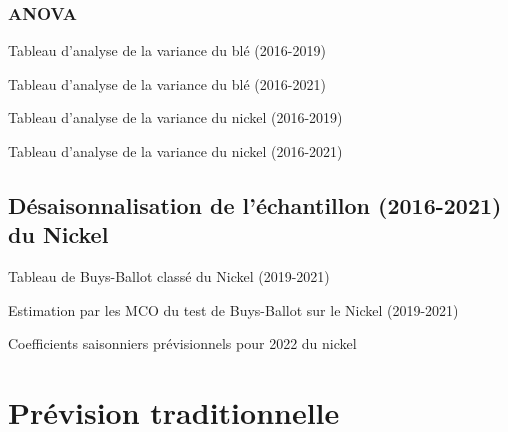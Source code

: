 \documentclass[12pt,a4paper]{article}
\begin{document}
\subsubsection{ANOVA}\label{appendix:anova}
\begin{table}[H]
    \sffamily
    \centering
    \label{tab:anova_ble19}
    
    \caption{Tableau d'analyse de la variance du blé (2016-2019) }
\end{table}
\begin{table}[H]
    \sffamily
    \centering
    \label{tab:anova_ble21}
    
    \caption{Tableau d'analyse de la variance du blé (2016-2021) }
\end{table}
\begin{table}[H]
    \sffamily
    \centering
    \label{tab:anova_nickel19}
    
    \caption{Tableau d'analyse de la variance du nickel (2016-2019) }
\end{table}
\begin{table}[H]
    \sffamily
    \centering
    \label{tab:anova_nickel21}
    
    \caption{Tableau d'analyse de la variance du nickel (2016-2021) }
\end{table}

\subsection{Désaisonnalisation de l'échantillon (2016-2021) du Nickel}
\begin{table}[H]
    \centering
    \caption{Tableau de Buys-Ballot classé du Nickel (2019-2021)}
    \sffamily
    \label{tab:bbc}
    \resizebox{\textwidth}{!}{}
\end{table}

\begin{table}[H]
    \centering
    \caption{Estimation par les MCO du test de Buys-Ballot sur le Nickel (2019-2021)}
    \sffamily
    \label{tab:bb_test}
    
\end{table}

\begin{table}[H]
    \centering
    \caption{Coefficients saisonniers prévisionnels pour 2022 du nickel}
    \sffamily
    \label{tab:coef_saiso}
    
\end{table}

\section{Prévision traditionnelle}
\setcounter{table}{0}
\setcounter{figure}{0}
\end{document}
